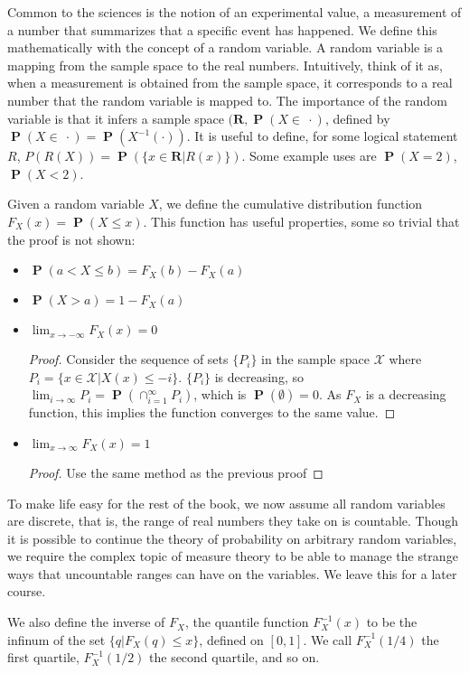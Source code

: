 \documentclass{report}
\DeclareMathOperator{\prob}{\mathbf{P}}
\begin{document}
Common to the sciences is the notion of an experimental value, a measurement of a number that summarizes that a specific event has happened. We define this mathematically with the concept of a random variable. A random variable is a mapping from the sample space to the real numbers. Intuitively, think of it as, when a measurement is obtained from the sample space, it corresponds to a real number that the random variable is mapped to. The importance of the random variable is that it infers a sample space $(\mathbf{R}, \prob(X \in\ \cdotp)$, defined by $\prob(X \in\ \cdotp) = \prob(X^{-1}(\cdotp))$. It is useful to define, for some logical statement $R$, $P(R(X)) = \prob(\{ x \in \mathbf{R} | R(x) \})$. Some example uses are $\prob(X = 2)$, $\prob(X < 2)$.

Given a random variable $X$, we define the cumulative distribution function $F_X(x) = \prob(X \leq x)$. This function has useful properties, some so trivial that the proof is not shown:
\begin{itemize}
    \item $\prob(a < X \leq b) = F_X(b) - F_X(a)$
    \item $\prob(X > a) = 1 - F_X(a)$
    \item $\lim_{x \to - \infty} F_X(x) = 0$
    \begin{proof} Consider the sequence of sets $\{ P_i \}$ in the sample space $\mathcal{X}$ where $P_i = \{ x \in \mathcal{X} | X(x) \leq -i \}$. $\{ P_i \}$ is decreasing, so $\lim_{i \to \infty} P_i = \prob(\cap_{i=1}^\infty P_i)$, which is $\prob(\emptyset) = 0$. As $F_X$ is a decreasing function, this implies the function converges to the same value.
    \end{proof}
    \item $\lim_{x \to \infty} F_X(x) = 1$
    \begin{proof} Use the same method as the previous proof \end{proof}
\end{itemize}

To make life easy for the rest of the book, we now assume all random variables are discrete, that is, the range of real numbers they take on is countable. Though it is possible to continue the theory of probability on arbitrary random variables, we require the complex topic of measure theory to be able to manage the strange ways that uncountable ranges can have on the variables. We leave this for a later course.

We also define the inverse of $F_X$, the quantile function $F_X^{-1}(x)$ to be the infinum of the set $\{ q | F_X(q) \leq x \}$, defined on $[0,1]$. We call $F_X^{-1}(1/4)$ the first quartile, $F_X^{-1}(1/2)$ the second quartile, and so on.
\end{document}

